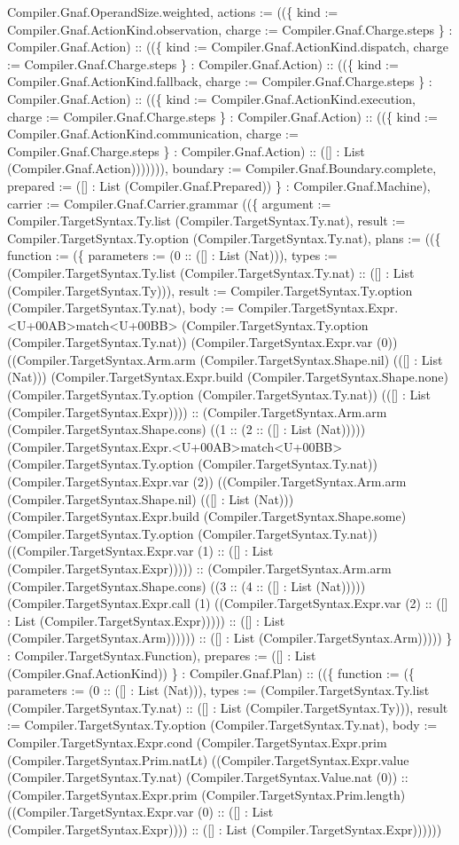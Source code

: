 \documentclass[11pt]{article}
\begin{document}
Compiler.Gnaf.OperandSize.weighted, actions := ((\{ kind := Compiler.Gnaf.ActionKind.observation, charge := Compiler.Gnaf.Charge.steps \} : Compiler.Gnaf.Action) :: ((\{ kind := Compiler.Gnaf.ActionKind.dispatch, charge := Compiler.Gnaf.Charge.steps \} : Compiler.Gnaf.Action) :: ((\{ kind := Compiler.Gnaf.ActionKind.fallback, charge := Compiler.Gnaf.Charge.steps \} : Compiler.Gnaf.Action) :: ((\{ kind := Compiler.Gnaf.ActionKind.execution, charge := Compiler.Gnaf.Charge.steps \} : Compiler.Gnaf.Action) :: ((\{ kind := Compiler.Gnaf.ActionKind.communication, charge := Compiler.Gnaf.Charge.steps \} : Compiler.Gnaf.Action) :: ([] : List (Compiler.Gnaf.Action))))))), boundary := Compiler.Gnaf.Boundary.complete, prepared := ([] : List (Compiler.Gnaf.Prepared)) \} : Compiler.Gnaf.Machine), carrier := Compiler.Gnaf.Carrier.grammar ((\{ argument := Compiler.TargetSyntax.Ty.list (Compiler.TargetSyntax.Ty.nat), result := Compiler.TargetSyntax.Ty.option (Compiler.TargetSyntax.Ty.nat), plans := ((\{ function := (\{ parameters := (0 :: ([] : List (Nat))), types := (Compiler.TargetSyntax.Ty.list (Compiler.TargetSyntax.Ty.nat) :: ([] : List (Compiler.TargetSyntax.Ty))), result := Compiler.TargetSyntax.Ty.option (Compiler.TargetSyntax.Ty.nat), body := Compiler.TargetSyntax.Expr.<U+00AB>match<U+00BB> (Compiler.TargetSyntax.Ty.option (Compiler.TargetSyntax.Ty.nat)) (Compiler.TargetSyntax.Expr.var (0)) ((Compiler.TargetSyntax.Arm.arm (Compiler.TargetSyntax.Shape.nil) (([] : List (Nat))) (Compiler.TargetSyntax.Expr.build (Compiler.TargetSyntax.Shape.none) (Compiler.TargetSyntax.Ty.option (Compiler.TargetSyntax.Ty.nat)) (([] : List (Compiler.TargetSyntax.Expr)))) :: (Compiler.TargetSyntax.Arm.arm (Compiler.TargetSyntax.Shape.cons) ((1 :: (2 :: ([] : List (Nat))))) (Compiler.TargetSyntax.Expr.<U+00AB>match<U+00BB> (Compiler.TargetSyntax.Ty.option (Compiler.TargetSyntax.Ty.nat)) (Compiler.TargetSyntax.Expr.var (2)) ((Compiler.TargetSyntax.Arm.arm (Compiler.TargetSyntax.Shape.nil) (([] : List (Nat))) (Compiler.TargetSyntax.Expr.build (Compiler.TargetSyntax.Shape.some) (Compiler.TargetSyntax.Ty.option (Compiler.TargetSyntax.Ty.nat)) ((Compiler.TargetSyntax.Expr.var (1) :: ([] : List (Compiler.TargetSyntax.Expr))))) :: (Compiler.TargetSyntax.Arm.arm (Compiler.TargetSyntax.Shape.cons) ((3 :: (4 :: ([] : List (Nat))))) (Compiler.TargetSyntax.Expr.call (1) ((Compiler.TargetSyntax.Expr.var (2) :: ([] : List (Compiler.TargetSyntax.Expr))))) :: ([] : List (Compiler.TargetSyntax.Arm)))))) :: ([] : List (Compiler.TargetSyntax.Arm))))) \} : Compiler.TargetSyntax.Function), prepares := ([] : List (Compiler.Gnaf.ActionKind)) \} : Compiler.Gnaf.Plan) :: ((\{ function := (\{ parameters := (0 :: ([] : List (Nat))), types := (Compiler.TargetSyntax.Ty.list (Compiler.TargetSyntax.Ty.nat) :: ([] : List (Compiler.TargetSyntax.Ty))), result := Compiler.TargetSyntax.Ty.option (Compiler.TargetSyntax.Ty.nat), body := Compiler.TargetSyntax.Expr.cond (Compiler.TargetSyntax.Expr.prim (Compiler.TargetSyntax.Prim.natLt) ((Compiler.TargetSyntax.Expr.value (Compiler.TargetSyntax.Ty.nat) (Compiler.TargetSyntax.Value.nat (0)) :: (Compiler.TargetSyntax.Expr.prim (Compiler.TargetSyntax.Prim.length) ((Compiler.TargetSyntax.Expr.var (0) :: ([] : List (Compiler.TargetSyntax.Expr)))) :: ([] : List (Compiler.TargetSyntax.Expr)))))) 
\end{document}
